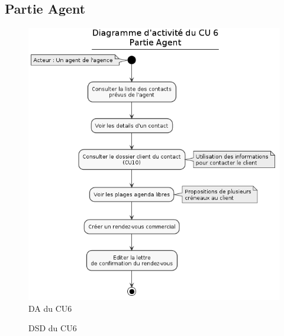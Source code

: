 \subsection{Partie Agent}
\begin{figure}[H]
\centering
\includegraphics[width=\textwidth]{figures/DA_CU6_partieAgent.png}
\caption{DA du CU6}
\end{figure}

\begin{figure}[H]
\centering
\caption{DSD du CU6}
\end{figure}

